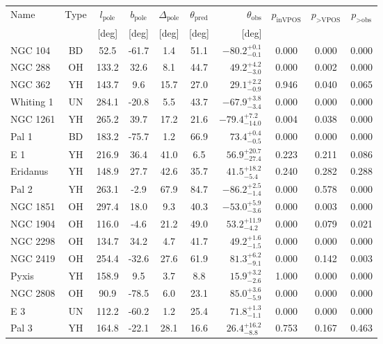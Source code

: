 \begingroup
\renewcommand{\arraystretch}{1.25}
\begin{tabular}{lcccccrccc}
	\toprule
	Name & Type & $l_\text{pole}$ & $b_\text{pole}$ & $\Delta_\text{pole}$ & $\theta_\text{pred}$ & $\theta_\text{obs}$ & $p_\text{inVPOS}$ & $p_\text{>VPOS}$ & $p_\text{>obs}$ \\
	 &  & [deg] & [deg] & [deg] & [deg] & [deg] &  &  &  \\
	\midrule
	NGC 104 & BD & 52.5 & -61.7 & 1.4 & 51.1 & $-80.2^{+0.1}_{-0.1}$ & 0.000 & 0.000 & 0.000 \\
	NGC 288 & OH & 133.2 & 32.6 & 8.1 & 44.7 & $49.2^{+4.2}_{-3.0}$ & 0.000 & 0.002 & 0.000 \\
	NGC 362 & YH & 143.7 & 9.6 & 15.7 & 27.0 & $29.1^{+2.2}_{-0.9}$ & 0.946 & 0.040 & 0.065 \\
	Whiting 1 & UN & 284.1 & -20.8 & 5.5 & 43.7 & $-67.9^{+3.8}_{-3.4}$ & 0.000 & 0.000 & 0.000 \\
	NGC 1261 & YH & 265.2 & 39.7 & 17.2 & 21.6 & $-79.4^{+7.2}_{-14.0}$ & 0.004 & 0.038 & 0.000 \\
	Pal 1 & BD & 183.2 & -75.7 & 1.2 & 66.9 & $73.4^{+0.4}_{-0.5}$ & 0.000 & 0.000 & 0.000 \\
	E 1 & YH & 216.9 & 36.4 & 41.0 & 6.5 & $56.9^{+20.7}_{-27.4}$ & 0.223 & 0.211 & 0.086 \\
	Eridanus & YH & 148.9 & 27.7 & 42.6 & 35.7 & $41.5^{+18.2}_{-5.4}$ & 0.240 & 0.282 & 0.288 \\
	Pal 2 & YH & 263.1 & -2.9 & 67.9 & 84.7 & $-86.2^{+2.5}_{-1.4}$ & 0.000 & 0.578 & 0.000 \\
	NGC 1851 & OH & 297.4 & 18.0 & 9.3 & 40.3 & $-53.0^{+5.9}_{-3.6}$ & 0.000 & 0.003 & 0.000 \\
	NGC 1904 & OH & 116.0 & -4.6 & 21.2 & 49.0 & $53.2^{+11.9}_{-4.2}$ & 0.000 & 0.079 & 0.021 \\
	NGC 2298 & OH & 134.7 & 34.2 & 4.7 & 41.7 & $49.2^{+1.6}_{-1.5}$ & 0.000 & 0.000 & 0.000 \\
	NGC 2419 & OH & 254.4 & -32.6 & 27.6 & 61.9 & $81.3^{+6.2}_{-9.1}$ & 0.000 & 0.142 & 0.003 \\
	Pyxis & YH & 158.9 & 9.5 & 3.7 & 8.8 & $15.9^{+3.2}_{-2.6}$ & 1.000 & 0.000 & 0.000 \\
	NGC 2808 & OH & 90.9 & -78.5 & 6.0 & 23.1 & $85.0^{+3.6}_{-5.9}$ & 0.000 & 0.000 & 0.000 \\
	E 3 & UN & 112.2 & -60.2 & 1.2 & 25.4 & $71.8^{+1.3}_{-1.1}$ & 0.000 & 0.000 & 0.000 \\
	Pal 3 & YH & 164.8 & -22.1 & 28.1 & 16.6 & $26.4^{+16.2}_{-8.8}$ & 0.753 & 0.167 & 0.463 \\

\end{tabular}
